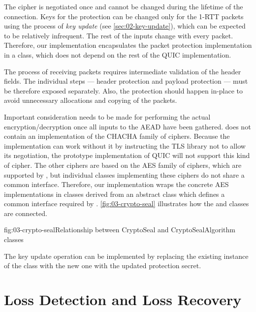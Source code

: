 The cipher is negotiated once and cannot be changed during the lifetime of the connection. Keys for
the protection can be changed only for the 1-RTT packets using the process of \textit{key update}
(see \autoref{sec:02-key-update}), which can be expected to be relatively infrequent. The rest of
the inputs change with every packet. Therefore, our implementation encapsulates the packet
protection implementation in a  class, which does not depend on the rest of the
QUIC implementation.

The process of receiving packets requires intermediate validation of the header fields. The
individual steps --- header protection and payload protection --- must be therefore exposed
separately. Also, the protection should happen in-place to avoid unnecessary allocations and copying
of the packets.

Important consideration needs to be made for performing the actual encryption/decryption once all
inputs to the AEAD have been gathered. \dotnet{} does not contain an implementation of the CHACHA
family of ciphers. Because the implementation can work without it by instructing the TLS library not
to allow its negotiation, the prototype implementation of QUIC will not support this kind of cipher.
The other ciphers are based on the AES family of ciphers, which are supported by \dotnet{}, but
individual classes implementing these ciphers do not share a common interface. Therefore, our
implementation wraps the concrete AES implementations in classes derived from an abstract
 class which defines a common interface required by \CryptoSeal{}.
\autoref{fig:03-crypto-seal} illustrates how the \CryptoSeal{} and 
classes are connected.

\begin{myFigure}{fig:03-crypto-seal}{Relationship between CryptoSeal and CryptoSealAlgorithm
classes}

  \resizebox{\linewidth}{!}{}

\end{myFigure}

The key update operation can be implemented by replacing the existing instance of the \CryptoSeal{}
class with the new one with the updated protection secret.

\section{Loss Detection and Loss Recovery}

